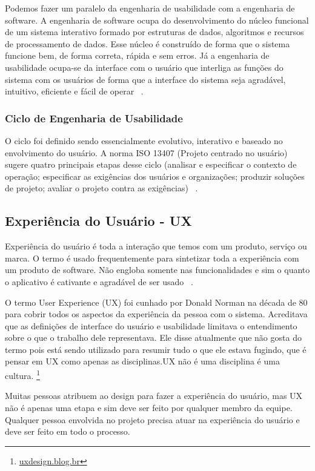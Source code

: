 Podemos fazer um paralelo da engenharia de usabilidade com a engenharia de software. A engenharia de software ocupa do desenvolvimento do núcleo funcional de um sistema interativo formado por estruturas de dados, algoritmos e recursos de processamento de dados. Esse núcleo é construído de forma que o sistema funcione bem, de forma correta, rápida e sem erros. Já a engenharia de usabilidade ocupa-se da interface com o usuário que interliga as funções do sistema com os usuários de forma que a interface do sistema seja agradável, intuitivo, eficiente e fácil de operar ~\cite{cybis2010}.



\subsubsection{Ciclo de Engenharia de Usabilidade}

	O ciclo foi definido sendo essencialmente evolutivo, interativo e baseado no envolvimento do usuário. A norma ISO 13407 (Projeto centrado no usuário) sugere quatro principais etapas desse ciclo (analisar e especificar o contexto de operação; especificar as exigências dos usuários e organizações; produzir soluções de projeto; avaliar o projeto contra as exigências) ~\cite{cybis2010}.


\subsection{Experiência do Usuário - UX}

	Experiência do usuário é toda a interação que temos com um produto, serviço ou marca. O termo é usado frequentemente para sintetizar toda a experiência com um produto de software. Não engloba  somente nas funcionalidades e sim o quanto o aplicativo é cativante e agradável de ser usado ~\cite{travis2013}.
	
	O termo User Experience (UX) foi cunhado por Donald Norman na década de 80 para cobrir todos os aspectos da experiência da pessoa com o sistema. Acreditava que as definições de interface do usuário e usabilidade limitava o entendimento sobre o que o trabalho dele representava. Ele disse atualmente que não gosta do termo pois está sendo utilizado para resumir tudo o que ele estava fugindo, que é pensar em UX como apenas as disciplinas.UX não é uma disciplina é uma cultura. \footnote{\url{uxdesign.blog.br}}

	Muitas pessoas atribuem ao design para fazer a experiência do usuário, mas UX não é apenas uma etapa e sim deve ser feito por qualquer membro da equipe. Qualquer pessoa envolvida no projeto precisa atuar na experiência do usuário e deve ser feito em todo o processo.
	
